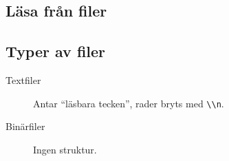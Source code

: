 \begin{frame}[fragile]
  \begin{example}
    
  \end{example}
\end{frame}

\begin{frame}[fragile]
  \begin{example}
    
  \end{example}
\end{frame}

\subsection{Läsa från filer}

\begin{frame}[fragile]
  \begin{example}
    
  \end{example}
\end{frame}

\begin{frame}[fragile]
  \begin{example}
    
  \end{example}
\end{frame}

\subsection{Typer av filer}

\begin{frame}
  \begin{remark}
    \begin{description}
      \item[Textfiler] Antar \enquote{läsbara tecken}, rader bryts med 
        \lstinline{\\n}.
      \item[Binärfiler] Ingen struktur.
    \end{description}
  \end{remark}
\end{frame}


